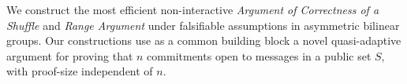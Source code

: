 %
We construct the most efficient non-interactive \emph{Argument of Correctness of a Shuffle} and \emph{Range Argument} under falsifiable assumptions in asymmetric bilinear groups.
Our constructions use as a common building block a novel quasi-adaptive argument for proving that $n$ commitments open to messages in a public set $S$, with proof-size independent of $n$.  
